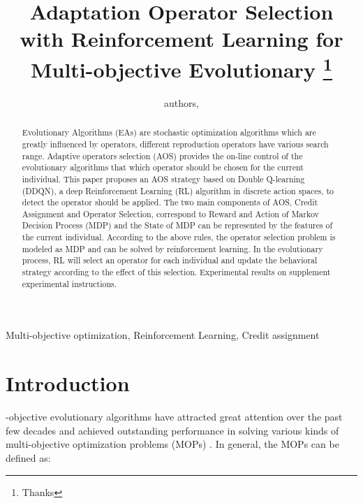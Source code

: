 \documentclass[journal]{IEEEtran}
\newcommand{\TODO}[1]{\textcolor[rgb]{1.00,0.40,0.22}{#1}}
\begin{document}
\title{{Adaptation Operator Selection with Reinforcement Learning for Multi-objective Evolutionary}
  \thanks{Thanks}}
\author{
  authors,
}%



\maketitle

\begin{abstract}
  Evolutionary Algorithms (EAs) are stochastic optimization algorithms which are greatly influenced by operators, different reproduction operators have various search range.
  Adaptive operators selection (AOS) provides the on-line control of the evolutionary algorithms that which operator should be chosen for the current individual.
  This paper proposes an AOS strategy based on Double Q-learning (DDQN), a deep Reinforcement Learning (RL) algorithm in discrete action spaces, to detect the operator should be applied.
  The two main components of AOS, Credit Assignment and Operator Selection, correspond to Reward and Action of Markov Decision Process (MDP) and the State of MDP can be represented by the features of the current individual. According to the above rules, the operator selection problem is modeled as MDP and can be solved by reinforcement learning. In the evolutionary process, RL will select an operator for each individual and update the behavioral strategy according to the effect of this selection. Experimental results on \TODO{supplement experimental instructions}.
\end{abstract}

\begin{IEEEkeywords}
  Multi-objective optimization, Reinforcement Learning, Credit assignment
\end{IEEEkeywords}

\section{Introduction}
-objective evolutionary algorithms have attracted great attention over the past few decades and achieved outstanding performance in solving various kinds of multi-objective optimization problems (MOPs) \cite{fialho2010adaptive,tian2019evolutionary}. In general, the MOPs can be defined as:
\end{document}
